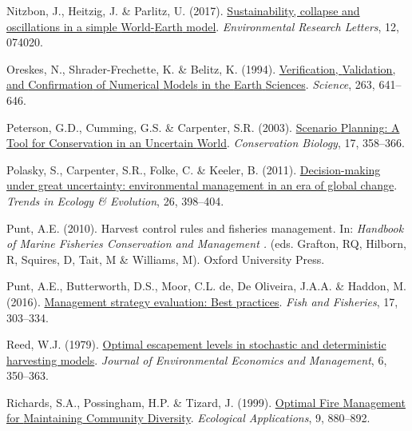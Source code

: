 \documentclass[3p]{elsarticle} %
\newlength{\cslhangindent}
\newenvironment{CSLReferences}[2] %
 {%
  \setlength{\parindent}{0pt}
  \ifodd #1 \everypar{\setlength{\hangindent}{\cslhangindent}}\ignorespaces\fi
  \ifnum #2 > 0
  \setlength{\parskip}{#2\baselineskip}
  \fi
 }%
 {}
\begin{document}
\begin{CSLReferences}{1}{0}
\leavevmode{}%
Nitzbon, J., Heitzig, J. \& Parlitz, U. (2017).
\href{https://doi.org/10.1088/1748-9326/aa7581}{Sustainability, collapse
and oscillations in a simple {World}-{Earth} model}. \emph{Environmental
Research Letters}, 12, 074020.

\leavevmode{}%
Oreskes, N., Shrader-Frechette, K. \& Belitz, K. (1994).
\href{https://doi.org/10.1126/science.263.5147.641}{Verification,
{Validation}, and {Confirmation} of {Numerical} {Models} in the {Earth}
{Sciences}}. \emph{Science}, 263, 641--646.

\leavevmode{}%
Peterson, G.D., Cumming, G.S. \& Carpenter, S.R. (2003).
\href{https://doi.org/10.1046/j.1523-1739.2003.01491.x}{Scenario
{Planning}: A {Tool} for {Conservation} in an {Uncertain} {World}}.
\emph{Conservation Biology}, 17, 358--366.

\leavevmode{}%
Polasky, S., Carpenter, S.R., Folke, C. \& Keeler, B. (2011).
\href{https://doi.org/10.1016/j.tree.2011.04.007}{{Decision-making under
great uncertainty: environmental management in an era of global
change}}. \emph{Trends in Ecology {\&} Evolution}, 26, 398--404.

\leavevmode{}%
Punt, A.E. (2010). Harvest control rules and fisheries management. In:
\emph{Handbook of {Marine} {Fisheries} {Conservation} and {Management}
.} (eds. Grafton, RQ, Hilborn, R, Squires, D, Tait, M \& Williams, M).
Oxford University Press.

\leavevmode{}%
Punt, A.E., Butterworth, D.S., Moor, C.L. de, De Oliveira, J.A.A. \&
Haddon, M. (2016). \href{https://doi.org/10.1111/faf.12104}{Management
strategy evaluation: Best practices}. \emph{Fish and Fisheries}, 17,
303--334.

\leavevmode{}%
Reed, W.J. (1979).
\href{https://doi.org/10.1016/0095-0696(79)90014-7}{{Optimal escapement
levels in stochastic and deterministic harvesting models}}.
\emph{Journal of Environmental Economics and Management}, 6, 350--363.

\leavevmode{}%
Richards, S.A., Possingham, H.P. \& Tizard, J. (1999).
\href{https://doi.org/10.1890/1051-0761(1999)009\%5B0880:OFMFMC\%5D2.0.CO;2}{Optimal
{Fire} {Management} for {Maintaining} {Community} {Diversity}}.
\emph{Ecological Applications}, 9, 880--892.


\end{CSLReferences}
\end{document}
